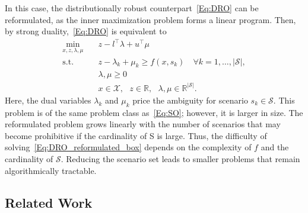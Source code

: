 \documentclass{article}
\newcommand{\mX}{\mathcal{X}}
\newcommand{\mS}{\mathcal{S}}
\newcommand{\R}{\mathbb{R}}
\newcommand{\scen}[1]{s_{#1}}%
\begin{document}
In this case, the distributionally robust counterpart~\eqref{Eq:DRO} can be reformulated, as the inner maximization problem forms a linear program. Then, by strong duality,~\eqref{Eq:DRO} is equivalent to
\begin{subequations}\label{Eq:DRO_reformulated_box}
	\begin{align}
		\min_{x,z,\lambda,\mu} \quad &z - l^\top \lambda + u^\top \mu
		\label{Eq:DRO_reformulated_box:a} \\
		\text{s.t. } \quad  & z- \lambda_k + \mu_k \geq f(x,\scen{k}) \quad \forall k=1,\ldots,|\mS|,
		\label{Eq:DRO_reformulated_box:b} \\
		&\lambda,\mu\geq 0		\label{Eq:DRO_reformulated_box:c} \\
		&x\in\mX,\text{ }z\in\R,\text{ }\lambda,\mu \in\R^{|\mS|}.
		\label{Eq:DRO_reformulated_box:d}
	\end{align}
\end{subequations}
Here, the dual variables \(\lambda_k\) and \(\mu_k\) price the ambiguity for scenario \(\scen{k}\in\mS\). 
This problem is of the same problem class as~\eqref{Eq:SO}; however, it is larger in size.
The reformulated problem grows linearly with the number of scenarios
that may become prohibitive if the cardinality of S is large.
Thus, the difficulty of solving~\eqref{Eq:DRO_reformulated_box} depends on the complexity of \(f\) and the cardinality of \(\mS\).
Reducing the scenario set leads to smaller problems that remain
algorithmically tractable.


\subsection{Related Work}

%

\end{document}
